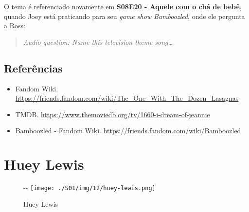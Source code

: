 O tema é referenciado novamente em
\textbf{\textcolor{primarycolor}{S08E20 - Aquele com o chá de bebê}},
quando Joey está praticando para seu \emph{game show Bamboozled}, onde
ele pergunta a Ross:

\begin{quote}
\emph{Audio question: Name this television theme song\ldots{}}
\end{quote}

\hypertarget{referuxeancias-1}{%
\subsection{Referências}\label{referuxeancias-1}}

\begin{itemize}
\tightlist
\item
  \sloppy Fandom Wiki. \url{https://friends.fandom.com/wiki/The_One_With_The_Dozen_Lasagnas}
\item
  \sloppy TMDB. \url{https://www.themoviedb.org/tv/1660-i-dream-of-jeannie}
\item
  \sloppy Bamboozled - Fandom Wiki. \url{https://friends.fandom.com/wiki/Bamboozled}
\end{itemize}

\hypertarget{huey-lewis}{%
\section{Huey Lewis}\label{huey-lewis}}

\begin{figure}[!ht]
  \begin{adjustwidth}{-\oddsidemargin-1in}{-\rightmargin}
    \centering
    \texttt{[image: ./S01/img/12/huey-lewis.png]}
    \caption{Huey Lewis\label{fig:huey-lewis}}
  \end{adjustwidth}
\end{figure}

